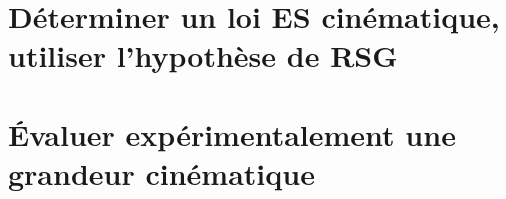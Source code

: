 \graphicspath{{\repStyle/png/}{../CIN/CIN-03-Transmetteurs/36_VisEcrou/images/}} 
 
 
\graphicspath{{\repStyle/png/}{../CIN/CIN-03-Transmetteurs/37_VisEcrou/images/}} 
 
 
\graphicspath{{\repStyle/png/}{../CIN/CIN-03-Transmetteurs/38_Treuil/images/}} 
 
 
\graphicspath{{\repStyle/png/}{../CIN/CIN-03-Transmetteurs/91_PorteAvion/images/}} 
 
 
\graphicspath{{\repStyle/png/}{../CIN/CIN-03-Transmetteurs/92_Colossus/images/}} 
 
 
\graphicspath{{\repStyle/png/}{../CIN/CIN-03-Transmetteurs/93_Lokomat/images/}} 
 
 
\graphicspath{{\repStyle/png/}{../CIN/CIN-03-Transmetteurs/94_Taurus/images/}} 
 
 
\clearpage 
\newpage 
\section{Déterminer un loi ES cinématique, utiliser l'hypothèse de RSG} 
\clearpage 
\newpage 
\section{Évaluer expérimentalement une grandeur cinématique} 
\clearpage 
\newpage 

 
